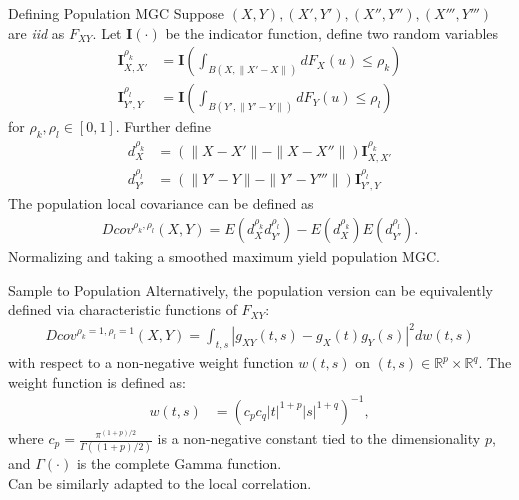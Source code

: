 \documentclass[mathserif,t]{beamer}
\newtheorem*{defi*}{Definition}
\providecommand{\mb}[1]{\boldsymbol{#1}}
\newcommand{\Mgc}{MGC}
\newcommand{\mbx}{X}
\newcommand{\mby}{Y}
\begin{document}
\begin{frame}{Defining Population \Mgc}
Suppose $(\mbx,\mby), (\mbx',\mby'), (\mbx'',\mby''), (\mbx''',\mby''')$ are \emph{iid} as $F_{XY}$. 
\pause
Let $\mb{I}(\cdot)$ be the indicator function, define two random variables
\begin{align*}
\mb{I}_{\mbx,\mbx'}^{\rho_{k}} &=\mb{I}(\int_{B(\mbx,\|\mbx'-\mbx\|)} dF_\mbx(u) \leq \rho_k)  \\
\mb{I}_{\mby',\mby}^{\rho_{l}} &=\mb{I}(\int_{B(\mby',\|\mby'-\mby\|)} dF_\mby(u) \leq \rho_l)
\end{align*}
for $\rho_{k},\rho_{l} \in [0,1]$.
\pause
Further define
\begin{align*}
d^{\rho_{k}}_{\mbx} &=(\| \mbx-\mbx' \| - \|\mbx-\mbx''\|) \mb{I}_{\mbx,\mbx'}^{\rho_{k}} \\
d^{\rho_{l}}_{\mby'} &=(\| \mby'-\mby \| - \|\mby'-\mby'''\|) \mb{I}_{\mby',\mby}^{\rho_{l}}
\end{align*}
\pause
The population local covariance can be defined as
\begin{align*}
Dcov^{\rho_{k}, \rho_{l}}(\mbx,\mby) = E(d^{\rho_{k}}_{\mbx} d^{\rho_{l}}_{\mby'}) - E(d^{\rho_{k}}_{\mbx}) E(d^{\rho_{l}}_{\mby'}).
\end{align*}
\pause
Normalizing and taking a smoothed maximum yield population \Mgc.
\end{frame}

\begin{frame}{Sample to Population}
\pause
Alternatively, the population version can be equivalently defined via characteristic functions of $F_{XY}$:
\pause 
\begin{align*}
Dcov^{\rho_{k}=1, \rho_{l}=1}(\mbx,\mby) = \int_{t,s} |g_{XY}(t,s)-g_{X}(t)g_{Y}(s)|^2 dw(t,s)
\end{align*}
with respect to a non-negative weight function $w(t,s)$ on $(t,s) \in \mathbb{R}^{p} \times \mathbb{R}^{q}$. The weight function is defined as:
\begin{align*}
		w(t,s) &=  (c_{p}c_{q} |t|^{1+p}|s|^{1+q})^{-1},
\end{align*}
where $c_{p}=\frac{\pi^{(1+p)/2}}{\Gamma((1+p)/2)}$ is a non-negative constant tied to the dimensionality $p$, and $\Gamma(\cdot)$ is the complete Gamma function.\\
\pause
\medskip
Can be similarly adapted to the local correlation.
\end{frame}
\end{document}
